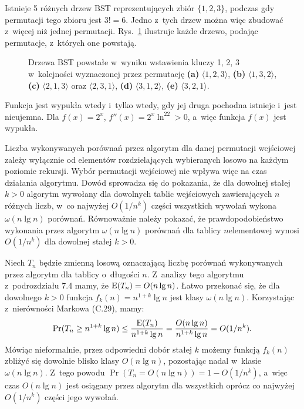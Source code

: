 \exercise %
Istnieje 5 różnych drzew BST reprezentujących zbiór $\{1,2,3\}$, podczas gdy permutacji tego zbioru jest $3!=6$.
Jedno z~tych drzew można więc zbudować z~więcej niż jednej permutacji.
Rys.~\ref{fig:12.4-3} ilustruje każde drzewo, podając permutacje, z~których one powstają.
\begin{figure}[!ht]
	\centering 
	\caption{Drzewa BST powstałe w~wyniku wstawienia kluczy 1, 2, 3 w~kolejności wyznaczonej przez permutację {\sffamily\bfseries(a)} $\langle1,2,3\rangle$,
{\sffamily\bfseries(b)} $\langle1,3,2\rangle$,
{\sffamily\bfseries(c)} $\langle2,1,3\rangle$ oraz $\langle2,3,1\rangle$, {\sffamily\bfseries(d)} $\langle3,1,2\rangle$, {\sffamily\bfseries(e)} $\langle3,2,1\rangle$.} \label{fig:12.4-3}
\end{figure}

\exercise %
Funkcja jest wypukła wtedy i~tylko wtedy, gdy jej druga pochodna istnieje i~jest nieujemna.
Dla $f(x)=2^x$, $f''(x)=2^x\ln^22>0$, a~więc funkcja $f(x)$ jest wypukła.

\exercise %

\noindent Liczba wykonywanych porównań przez algorytm  dla danej permutacji wejściowej zależy wyłącznie od elementów rozdzielających wybieranych losowo na każdym poziomie rekursji.
Wybór permutacji wejściowej nie wpływa więc na czas działania algorytmu.
Dowód sprowadza się do pokazania, że dla dowolnej stałej $k>0$ algorytm  wywołany dla dowolnych tablic wejściowych zawierających $n$ różnych liczb, w~co najwyżej $O(1/n^k)$ części wszystkich wywołań wykona $\omega(n\lg n)$ porównań.
Równoważnie należy pokazać, że prawdopodobieństwo wykonania przez algorytm $\omega(n\lg n)$ porównań dla tablicy $n$\nbhyphen elementowej wynosi $O(1/n^k)$ dla dowolnej stałej $k>0$.

Niech $T_n$ będzie zmienną losową oznaczającą liczbę porównań wykonywanych przez algorytm  dla tablicy o~długości $n$.
Z~analizy tego algorytmu z~podrozdziału 7.4 mamy, że $\operatorname{E}(T_n)=O(n\lg n)$.
Łatwo przekonać się, że dla dowolnego $k>0$ funkcja $f_k(n)=n^{1+k}\lg n$ jest klasy $\omega(n\lg n)$.
Korzystając z~nierówności Markowa (C.29), mamy:
\[
	\Pr(T_n\ge n^{1+k}\lg n) \le \frac{\operatorname{E}(T_n)}{n^{1+k}\lg n} = \frac{O(n\lg n)}{n^{1+k}\lg n} = O(1/n^k).
\]
Mówiąc nieformalnie, przez odpowiedni dobór stałej $k$ możemy funkcją $f_k(n)$ zbliżyć się dowolnie blisko klasy $O(n\lg n)$, pozostając nadal w~klasie $\omega(n\lg n)$.
Z~tego powodu $\Pr(T_n=O(n\lg n))=1-O(1/n^k)$, a~więc czas $O(n\lg n)$ jest osiągany przez algorytm dla wszystkich oprócz co najwyżej $O(1/n^k)$ części jego wywołań.
